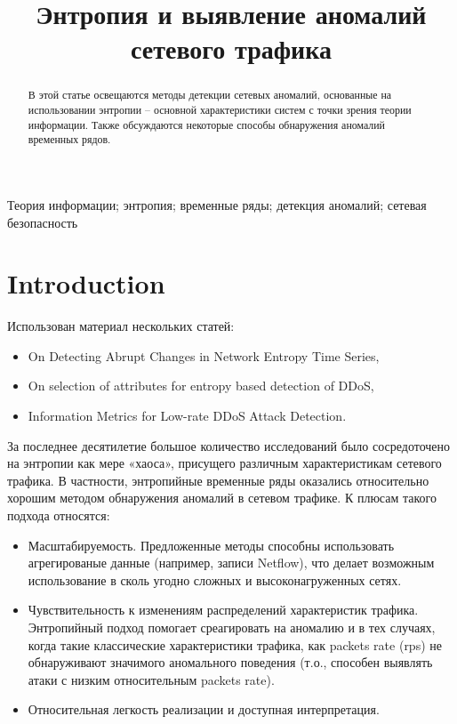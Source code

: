 \documentclass[]{interact}
\theoremstyle{plain}%
\theoremstyle{definition}
\theoremstyle{remark}
\begin{document}

\title{Энтропия и выявление аномалий сетевого трафика}

\author{
}

\maketitle

\begin{abstract}
В этой статье освещаются методы детекции сетевых аномалий, основанные на использовании энтропии -- основной характеристики систем с точки зрения теории информации. Также обсуждаются некоторые способы обнаружения аномалий временных рядов.
\end{abstract}

\begin{keywords}
Теория информации; энтропия; временные ряды; детекция аномалий; сетевая безопасность
\end{keywords}


\section{Introduction}

Использован материал нескольких статей:
\begin{itemize}
    \item On Detecting Abrupt Changes in Network Entropy Time Series,
    \item On selection of attributes for entropy based detection of DDoS,
    \item Information Metrics for Low-rate DDoS Attack Detection.
\end{itemize}

За последнее десятилетие большое количество исследований было сосредоточено на энтропии как мере «хаоса», присущего различным характеристикам сетевого трафика. В частности, энтропийные временные ряды оказались относительно хорошим методом обнаружения аномалий в сетевом трафике. К плюсам такого подхода относятся:
\begin{itemize}
    \item Масштабируемость. Предложенные методы способны использовать агрегированые данные (например, записи Netflow), что делает возможным использование в сколь угодно сложных и высоконагруженных сетях.
    \item Чувствительность к изменениям распределений характеристик трафика. Энтропийный подход помогает среагировать на аномалию и в тех случаях, когда такие классические характеристики трафика, как packets rate (rps) не обнаруживают значимого аномального поведения (т.о., способен выявлять атаки с низким относительным packets rate).
    \item Относительная легкость реализации и доступная интерпретация.
\end{itemize}
\end{document}
